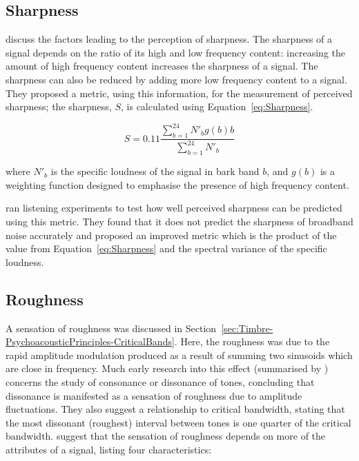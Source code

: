 	\subsection{Sharpness}
	\label{sec:Timbre-TimbralFeatures-Sharpness}
		\citet{fastl2007psychoacoustics} discuss the factors leading to the perception of sharpness. The sharpness
		of a signal depends on the ratio of its high and low frequency content: increasing the amount of high
		frequency content increases the sharpness of a signal. The sharpness can also be reduced by adding more low
		frequency content to a signal. They proposed a metric, using this information, for the measurement of
		perceived sharpness; the sharpness, $S$, is calculated using Equation~\ref{eq:Sharpness}.

		\begin{equation}
			S = 0.11\frac{\sum_{b = 1}^{24} N'_{b}g(b)b}{\sum_{b = 1}^{24}N'_{b}}
			\label{eq:Sharpness}
		\end{equation}

		where $N'_{b}$ is the specific loudness of the signal in bark band $b$, and $g(b)$ is a weighting function
		designed to emphasise the presence of high frequency content.

		\citet{marui2006predicting} ran listening experiments to test how well perceived sharpness can be predicted
		using this metric. They found that it does not predict the sharpness of broadband noise accurately and
		proposed an improved metric which is the product of the value from Equation~\ref{eq:Sharpness} and the
		spectral variance of the specific loudness.

	\subsection{Roughness}
	\label{sec:Timbre-TimbralFeatures-Roughness}
		A sensation of roughness was discussed in Section~\ref{sec:Timbre-PsychoacousticPrinciples-CriticalBands}.
		Here, the roughness was due to the rapid amplitude modulation produced as a result of summing two sinusoids
		which are close in frequency. Much early research into this effect (summarised by \citet{plomp1965tonal})
		concerns the study of consonance or dissonance of tones, concluding that dissonance is manifested as a
		sensation of roughness due to amplitude fluctuations. They also suggest a relationship to critical
		bandwidth, stating that the most dissonant (roughest) interval between tones is one quarter of the critical
		bandwidth. \citet{vassilakis2010psychoacoustic} suggest that the sensation of roughness depends on more of
		the attributes of a signal, listing four characteristics:


